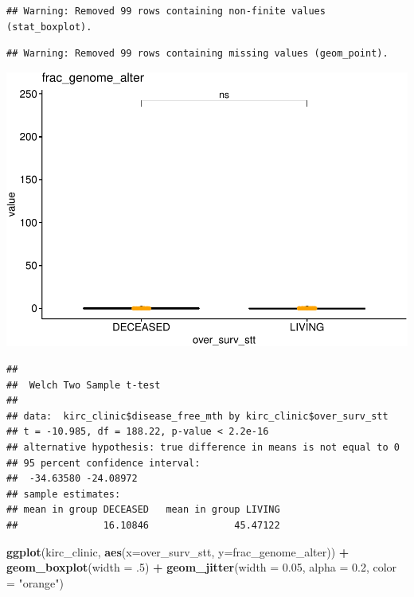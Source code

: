 \documentclass[]{article}
\newenvironment{Shaded}{\begin{snugshade}}{\end{snugshade}}
\newcommand{\KeywordTok}[1]{\textcolor[rgb]{0.13,0.29,0.53}{\textbf{#1}}}
\newcommand{\DataTypeTok}[1]{\textcolor[rgb]{0.13,0.29,0.53}{#1}}
\newcommand{\DecValTok}[1]{\textcolor[rgb]{0.00,0.00,0.81}{#1}}
\newcommand{\FloatTok}[1]{\textcolor[rgb]{0.00,0.00,0.81}{#1}}
\newcommand{\StringTok}[1]{\textcolor[rgb]{0.31,0.60,0.02}{#1}}
\newcommand{\OperatorTok}[1]{\textcolor[rgb]{0.81,0.36,0.00}{\textbf{#1}}}
\newcommand{\NormalTok}[1]{#1}
\begin{document}
\begin{verbatim}
## Warning: Removed 99 rows containing non-finite values (stat_boxplot).
\end{verbatim}

\begin{verbatim}
## Warning: Removed 99 rows containing missing values (geom_point).
\end{verbatim}

\includegraphics{figs/render-unnamed-chunk-12-3.pdf}

\begin{Shaded}
\end{Shaded}

\begin{verbatim}
## 
##  Welch Two Sample t-test
## 
## data:  kirc_clinic$disease_free_mth by kirc_clinic$over_surv_stt
## t = -10.985, df = 188.22, p-value < 2.2e-16
## alternative hypothesis: true difference in means is not equal to 0
## 95 percent confidence interval:
##  -34.63580 -24.08972
## sample estimates:
## mean in group DECEASED   mean in group LIVING 
##               16.10846               45.47122
\end{verbatim}

\begin{Shaded}
\begin{Highlighting}[]
\KeywordTok{ggplot}\NormalTok{(kirc_clinic, }\KeywordTok{aes}\NormalTok{(}\DataTypeTok{x=}\NormalTok{over_surv_stt, }\DataTypeTok{y=}\NormalTok{frac_genome_alter)) }\OperatorTok{+}
\StringTok{  }\KeywordTok{geom_boxplot}\NormalTok{(}\DataTypeTok{width =}\NormalTok{ .}\DecValTok{5}\NormalTok{) }\OperatorTok{+}
\StringTok{  }\KeywordTok{geom_jitter}\NormalTok{(}\DataTypeTok{width =} \FloatTok{0.05}\NormalTok{, }\DataTypeTok{alpha =} \FloatTok{0.2}\NormalTok{, }\DataTypeTok{color =} \StringTok{"orange"}\NormalTok{)}
\end{Highlighting}
\end{Shaded}
\end{document}

